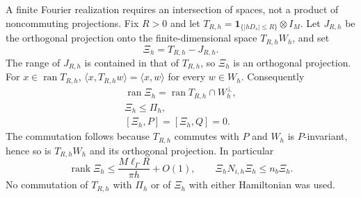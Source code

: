 \documentclass[aps,pra,reprint,superscriptaddress,longbibliography]{revtex4-2}
\newcommand{\one}{\mathbf 1}
\begin{document}
A finite Fourier realization requires an intersection of spaces,
not a product of noncommuting projections.  Fix $R>0$ and let
$T_{R,h}=\one_{\{|hD_s|\le R\}}\otimes I_M$.  Let $J_{R,h}$ be the
orthogonal projection onto the finite-dimensional space $T_{R,h}W_h$,
and set
\begin{equation}
 \Xi_h=T_{R,h}-J_{R,h}.
 \label{sgt:bose:intersection-definition}
\end{equation}
The range of $J_{R,h}$ is contained in that of $T_{R,h}$, so $\Xi_h$
is an orthogonal projection.  For $x\in\operatorname{ran}T_{R,h}$,
$\langle x,T_{R,h}w\rangle=\langle x,w\rangle$ for every $w\in W_h$.
Consequently
\begin{equation}
\begin{gathered}
 \operatorname{ran}\Xi_h
   =\operatorname{ran}T_{R,h}\cap W_h^\perp,
 \\
\Xi_h\le\Pi_h,
 \\
[\Xi_h,P]=[\Xi_h,Q]=0.
 \label{sgt:bose:intersection}
\end{gathered}
\end{equation}
The commutation follows because $T_{R,h}$ commutes with $P$ and
$W_h$ is $P$-invariant, hence so is $T_{R,h}W_h$ and its orthogonal
projection.  In particular
\begin{equation}
 \operatorname{rank}\Xi_h
   \le\frac{M\ell_\Gamma R}{\pi h}+O(1),
 \qquad \Xi_hN_{i,h}\Xi_h\le n_b\Xi_h.
 \label{sgt:bose:finite-filter-bound}
\end{equation}
No commutation of $T_{R,h}$ with $\Pi_h$ or of $\Xi_h$ with either
Hamiltonian was used.
\end{document}
